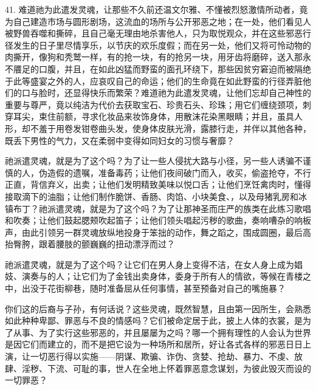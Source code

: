 41. 难道祂为此遣发灵魂，让那些不久前还温文尔雅、不懂被烈怒激情所动者，竟为自己建造市场与圆形剧场，这流血的场所与公开邪恶之地；在一处，他们看见人被野兽吞噬和撕碎，且自己毫无理由地杀害他人，只为取悦观众，并在这些邪恶行径发生的日子里尽情享乐，以节庆的欢乐度假；而在另一处，他们又将可怜动物的肉撕开，像狗和秃鹫一样，有的抢一块，有的抢另一块，用牙齿将磨碎，送入那永不餍足的口腹，并且，在如此凶猛而野蛮的面孔环绕下，那些因贫穷窘迫而被隔绝于此等盛宴之外的人，应哀叹自己的命运；他们的生命竟在如此野蛮的行径弄脏他们的口与脸时，还显得快乐而繁荣？难道祂为此遣发灵魂，让他们忘却自己神性的重要与尊严，竟以纯洁为代价去获取宝石、珍贵石头、珍珠；用它们缠绕颈项，刺穿耳尖，束住前额，寻求化妆品来妆饰身体，用散沫花染黑眼睛；并且，虽具人形，却不羞于用卷发钳卷曲头发，使身体皮肤光滑，露膝行走，并伴以其他各种，既丢下男性的气力，又在柔弱中变得如同妇女的习惯与奢靡？\par

祂派遣灵魂，就是为了这个吗？为了让一些人侵扰大路与小径，另一些人诱骗不谨慎的人，伪造假的遗嘱，准备毒药；让他们夜间破门而入，收买，偷盗抢夺，不行正直，背信弃义，出卖；让他们发明精致美味以悦口舌；让他们烹饪禽肉时，懂得接取滴下的油脂；让他们制作脆饼、香肠、肉馅、小块美食、，以及母猪乳房和冰镇布丁？祂派遣灵魂，就是为了这个吗？为了让那神圣而庄严的族类在此练习歌唱和吹奏；让他们鼓起腮颊吹起笛子；让他们领头唱起污秽的歌曲，奏响嘈杂的响板声，由此引领另一群灵魂放纵地投身于笨拙的动作，舞之蹈之，围成圆圈，最后高抬臀胯，跟着腰肢的颤巍巍的扭动漂浮而过？\par

祂派遣灵魂，就是为了这个吗？让它们在男人身上变得不洁，在女人身上成为娼妓、演奏与的人；让它们为了金钱出卖身体，委身于所有人的情欲，等候在青楼之中，出没于花街柳巷，随时准备屈从任何事情，甚至预备对自己的嘴施暴？\par

你们这的后裔与子孙，有何话说？这些灵魂，既然智慧，且由第一因所生，会熟悉如此种种卑鄙、罪恶与不良的情感吗？它们被命定居于此，披上人体的衣裳，是为了从事、为了实行这些邪恶的，并且屡屡为之吗？哪一个拥有理性的人会认为世界是因它们而建立的，而不是把它设为一种场所和居所，好让各式各样的邪恶日日上演，让一切恶行得以实施——阴谋、欺骗、诈伪、贪婪、抢劫、暴力、不虔、放肆、淫秽、下流、可耻的事，世人在全地上怀着罪恶意念谋划，为彼此毁灭而设的一切罪恶？\par

